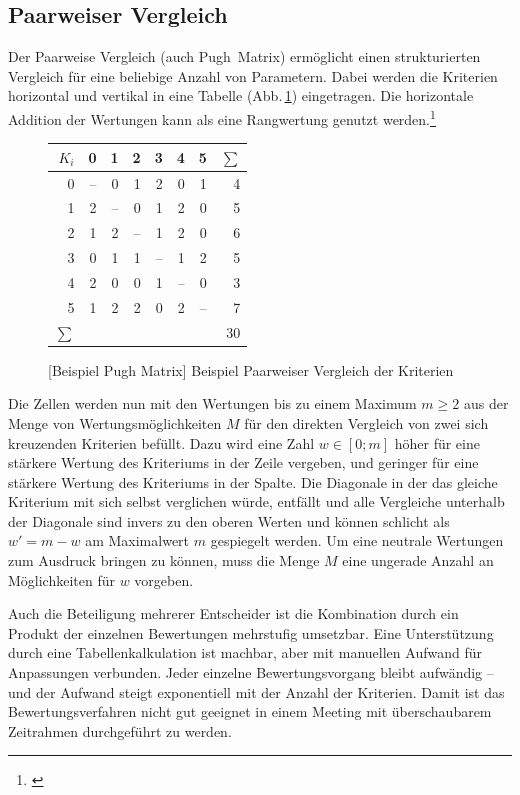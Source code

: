 \subsection{Paarweiser Vergleich}\label{dep:pugh}

Der Paarweise Vergleich (auch Pugh~Matrix) ermöglicht einen strukturierten Vergleich für eine beliebige Anzahl von Parametern.
Dabei werden die Kriterien horizontal und vertikal in eine Tabelle (Abb.\,\ref{abb:pugh-matrix}) eingetragen.
Die horizontale Addition der Wertungen kann als eine Rangwertung genutzt werden.\footnote{\cite{TN_libero_mab21000123709}}

\begin{figure}[!htp]
\centering
\begin{tabular}{|r||r|r|r|r|r|r||r|}
\hline
\(K_i\)	& 0 	& 1 	& 2 	& 3 	& 4 	& 5	& \(\sum{}\)\\
\hline \hline
0		& --	& 0		& 1		& 2		& 0		& 1	& 4			\\
\hline
1		& 2		& --	& 0		& 1		& 2		& 0	& 5			\\
\hline
2		& 1		& 2		& --	& 1		& 2		& 0	& 6			\\
\hline
3		& 0		& 1		& 1		& --	& 1		& 2	& 5			\\
\hline
4		& 2		& 0		& 0		& 1		& --	& 0	& 3			\\
\hline
5		& 1		& 2		& 2		& 0		& 2		& --& 7			\\
\hline \hline
\(\sum{}\) & \multicolumn{6}{r||}{} & {30} \\
\hline
\end{tabular}
[Beispiel Pugh Matrix]{\label{abb:pugh-matrix} Beispiel Paarweiser Vergleich der Kriterien}
\end{figure}

Die Zellen werden nun mit den Wertungen bis zu einem Maximum \(m \ge 2\) aus der Menge von Wertungsmöglichkeiten \(M\) für den direkten Vergleich von zwei sich kreuzenden Kriterien befüllt.
Dazu wird eine Zahl \(w \in [0;m] \)  höher für eine stärkere Wertung des Kriteriums in der Zeile vergeben, und geringer für eine stärkere Wertung des Kriteriums in der Spalte.
Die Diagonale in der das gleiche Kriterium mit sich selbst verglichen würde, entfällt und alle Vergleiche unterhalb der Diagonale sind invers zu den oberen Werten und können schlicht als \(w' = m - w\) am Maximalwert \(m\) gespiegelt werden.
Um eine neutrale Wertungen zum Ausdruck bringen zu können, muss die Menge \(M\) eine ungerade Anzahl an Möglichkeiten für \(w\) vorgeben.

Auch die Beteiligung mehrerer Entscheider ist die Kombination durch ein Produkt der einzelnen Bewertungen mehrstufig umsetzbar.
Eine Unterstützung durch \zB{} eine Tabellenkalkulation ist machbar, aber mit manuellen Aufwand für Anpassungen verbunden.
Jeder einzelne Bewertungsvorgang bleibt aufwändig -- und der Aufwand steigt exponentiell mit der Anzahl der Kriterien.
Damit ist das Bewertungsverfahren nicht gut geeignet in einem Meeting mit überschaubarem Zeitrahmen durchgeführt zu werden.


